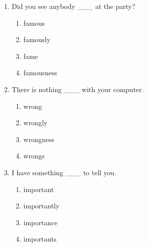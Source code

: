 \documentclass[11pt,a4paper]{ctexart}
\begin{document}
\begin{enumerate}[leftmargin=*,itemsep=4pt]
\begin{enumerate}[label=\Alph*.,leftmargin=2em,itemsep=1pt,topsep=2pt]
\item sweets
\end{enumerate}
\item Did you see anybody \_\_\_ at the party?
\begin{enumerate}[label=\Alph*.,leftmargin=2em,itemsep=1pt,topsep=2pt]
\item famous
\item famously
\item fame
\item famousness
\end{enumerate}
\item There is nothing \_\_\_ with your computer.
\begin{enumerate}[label=\Alph*.,leftmargin=2em,itemsep=1pt,topsep=2pt]
\item wrong
\item wrongly
\item wrongness
\item wrongs
\end{enumerate}
\item I have something \_\_\_ to tell you.
\begin{enumerate}[label=\Alph*.,leftmargin=2em,itemsep=1pt,topsep=2pt]
\item important
\item importantly
\item importance
\item importants
\end{enumerate}
\end{enumerate}
\end{document}
